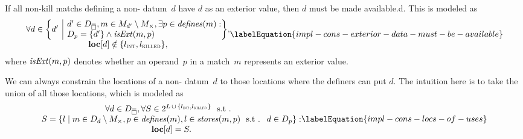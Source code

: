 If all non-\glspl{kill match} defining a non-
\gls{datum}~$d$ have $d$ as an \gls{exterior value}, then $d$ must be made
\gls{available.d}.
%
This is modeled as
%
\begin{equation}
  \begin{array}{@{}c@{}}
    \forall d \in
      \mSetBuilder*{d'}%
                   {%
                     \begin{array}{@{}l@{}}
                       d' \in \mStateDataCompSet,
                       m \in \mMatchSet[d'] \setminus \mKillMatchSet,
                       \exists p \in \mDefines(m) : \\
                       \mDataSet[p] = \mSet{d'} \mAnd \mIsExt(m, p)
                     \end{array}
                   } \!, \\
    \mVar{loc}[d] \notin \mSet{\mIntLocation, \mKilledLocation},
  \end{array}
  \labelEquation{impl-cons-exterior-data-must-be-available}
\end{equation}
%
where \mbox{$\operatorname{\textrm{\textit{isExt}}}(m, p)$} denotes whether an \gls{operand}~$p$ in a
\gls{match}~$m$ represents an \gls{exterior value}.

We can always constrain the \glspl{location} of a non-
\gls{datum}~$d$ to those \glspl{location} where the definers can put $d$.
%
The intuition here is to take the union of all those \glspl{location}, which is
modeled as
%
\begin{equation}
  \begin{array}{@{}c@{}}
    \forall d \in \mStateDataCompSet,
    \forall S \in
      \mPowerset{\mLocationSet
      \, \cup \,
      \mSet{\mIntLocation, \mKilledLocation}} \text{ \st} \\
    S = \mSetBuilder{l}%
                    {%
                      m \in \mDataSet[d] \setminus \mKillMatchSet,
                      p \in \mDefines(m),
                      l \in \mStores(m, p)
                      \text{ \st }
                      d \in \mDataSet[p]
                    } : \\
    \mVar{loc}[d] = S.
  \end{array}
  \labelEquation{impl-cons-locs-of-uses}
\end{equation}

